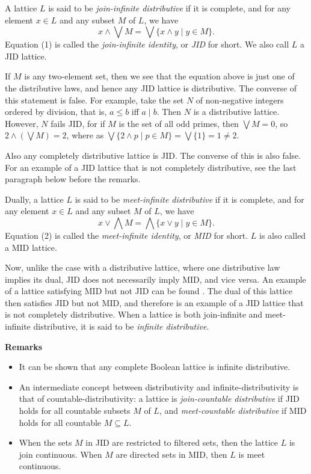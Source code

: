 \documentclass[12pt]{article}
\begin{document}
A lattice $L$ is said to be \emph{join-infinite distributive} if it is complete, and for any element $x \in L$ and any subset $M$ of $L$, we have
\begin{equation}
x\wedge \bigvee M =\bigvee \lbrace x\wedge y \mid y \in M\rbrace.
\end{equation}
Equation (1) is called the \emph{join-infinite identity}, or \emph{JID} for short.  We also call $L$ a JID lattice.

If $M$ is any two-element set, then we see that the equation above is just one of the distributive laws, and hence any JID lattice is distributive.  The converse of this statement is false.  For example, take the set $N$ of non-negative integers ordered by division, that is, $a\le b$ iff $a\mid b$.  Then $N$ is a distributive lattice.  However, $N$ fails JID, for if $M$ is the set of all odd primes, then $\bigvee M=0$, so $2\wedge (\bigvee M) = 2$, where as $\bigvee \lbrace 2\wedge p \mid p\in M\rbrace = \bigvee \lbrace 1\rbrace  = 1\ne 2$.

Also any completely distributive lattice is JID.  The converse of this is also false.  For an example of a JID lattice that is not completely distributive, see the last paragraph below before the remarks.

Dually, a lattice $L$ is said to be \emph{meet-infinite distributive} if it is complete, and for any element $x \in L$ and any subset $M$ of $L$, we have
\begin{equation}
x\vee \bigwedge M =\bigwedge \lbrace x\vee y \mid y \in M\rbrace.
\end{equation}
Equation (2) is called the \emph{meet-infinite identity}, or \emph{MID} for short.  $L$ is also called a MID lattice.

Now, unlike the case with a distributive lattice, where one distributive law implies its dual, JID does not necessarily imply MID, and vice versa.  An example of a lattice satisfying MID but not JID can be found .  The dual of this lattice then satisfies JID but not MID, and therefore is an example of a JID lattice that is not completely distributive.  When a lattice is both join-infinite and meet-infinite distributive, it is said to be \emph{infinite distributive}.

\textbf{Remarks}

\begin{itemize}

\item It can be shown that any complete Boolean lattice is infinite distributive.

\item An intermediate concept between distributivity and infinite-distributivity is that of countable-distributivity: a lattice is \emph{join-countable distributive} if JID holds for all countable subsets $M$ of $L$, and \emph{meet-countable distributive} if MID holds for all countable $M\subseteq L$.

\item When the sets $M$ in JID are restricted to filtered sets, then the lattice $L$ is join continuous.  When $M$ are directed sets in MID, then $L$ is meet continuous.

\end{itemize}
\end{document}
